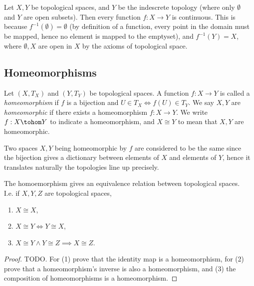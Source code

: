 \begin{example}
  Let $X,Y$ be topological spaces, and $Y$ be the indescrete topology (where
  only $\emptyset$ and $Y$ are open subsets). Then every function $f:X\to Y$ is
  continuous. This is because $f^{-1}(\emptyset)=\emptyset$ (by definition of a
    function, every point in the domain must be mapped, hence no element is
  mapped to the emptyset), and $f^{-1}(Y)=X$, where $\emptyset, X$ are open in
  $X$ by the axioms of topological space. 
\end{example}

\subsection{Homeomorphisms}
\begin{definition}
  Let $(X,T_X)$ and $(Y,T_Y)$ be topological spaces. A function $f:X\to Y$ is
  called a \emph{homeomorphism} if $f$ is a bijection and $U\in T_X \iff
  f(U)\in T_Y$. We say $X,Y$ are \emph{homeomorphic} if there exists a
  homeomorphism $f:X\to Y$. We write $f:X\tohom Y$ to indicate a
  homeomorphism, and $X\cong Y$ to mean that $X,Y$ are homeomorphic.
  \label{def:homeomorphism}
\end{definition}
Two spaces $X,Y$ being homeomorphic by $f$ are considered to be the same since
the bijection gives a dictionary between elements of $X$ and elements of $Y$,
hence it translates naturally the topologies line up precisely.

\begin{proposition}
  The homoemorphism gives an equivalence relation between topological spaces.
  I.e. if $X,Y,Z$ are topological spaces, 
  \begin{enumerate}
    \item $X\cong X$,
    \item $X\cong Y \iff Y\cong X$,
    \item $X\cong Y \land Y\cong Z \implies X\cong Z$.
  \end{enumerate}
  \label{<+label+>}
\end{proposition}
\begin{proof}
  TODO. For (1) prove that the identity map is a homeomorphism, for (2) prove
  that a homeomorphism's inverse is also a homeomorphism, and (3) the
  composition of homeomorphisms is a homeomorphism.
\end{proof}

